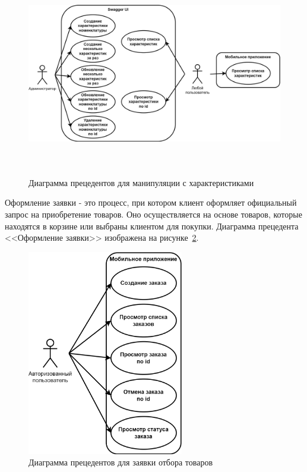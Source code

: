 \begin{figure}[!htb]
    \centering

    \includegraphics[height=9cm]
    {images/UML/UML_precedent_item_characteristics.png}

    \caption{Диаграмма прецедентов для манипуляции с характеристиками}

    \label{fig:UML_precedent_item_characteristics}
\end{figure}

Оформление заявки - это процесс, при котором клиент оформляет официальный запрос на приобретение товаров.
Оно осуществляется на основе товаров, которые находятся в корзине или выбраны клиентом для покупки.
Диаграмма прецедента <<Оформление заявки>> изображена на рисунке~\ref{fig:UML_precedent_order_items}.

\begin{figure}[!htb]
    \centering

    \includegraphics[height=9cm]
    {images/UML/UML_precedent_order_items.png}

    \caption{Диаграмма прецедентов для заявки отбора товаров}

    \label{fig:UML_precedent_order_items}
\end{figure}

